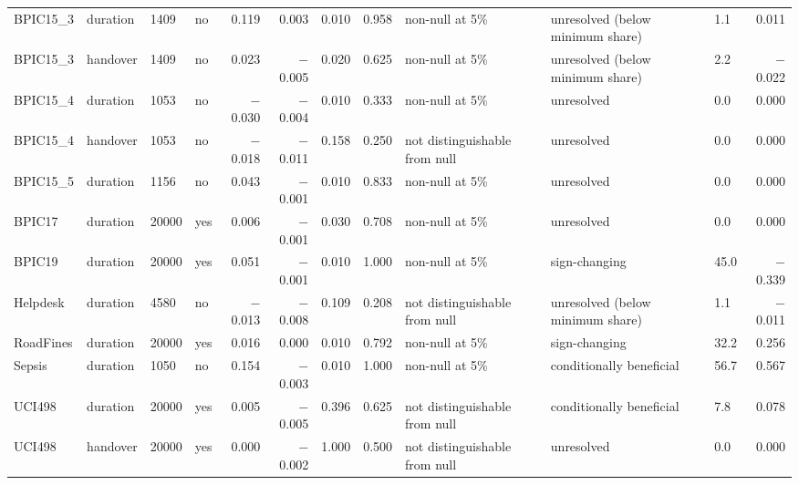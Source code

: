 \begin{landscape}
\begin{table}[t]
{\begin{tabular}{llllrrrrlllr}
BPIC15\_3 & duration & 1409 & no & 0.119 & 0.003 & 0.010 & 0.958 & non-null at 5\% & unresolved (below minimum share) & 1.1 & 0.011 \\
BPIC15\_3 & handover & 1409 & no & 0.023 & $-$0.005 & 0.020 & 0.625 & non-null at 5\% & unresolved (below minimum share) & 2.2 & $-$0.022 \\
BPIC15\_4 & duration & 1053 & no & $-$0.030 & $-$0.004 & 0.010 & 0.333 & non-null at 5\% & unresolved & 0.0 & 0.000 \\
BPIC15\_4 & handover & 1053 & no & $-$0.018 & $-$0.011 & 0.158 & 0.250 & not distinguishable from null & unresolved & 0.0 & 0.000 \\
BPIC15\_5 & duration & 1156 & no & 0.043 & $-$0.001 & 0.010 & 0.833 & non-null at 5\% & unresolved & 0.0 & 0.000 \\
BPIC17 & duration & 20000 & yes & 0.006 & $-$0.001 & 0.030 & 0.708 & non-null at 5\% & unresolved & 0.0 & 0.000 \\
BPIC19 & duration & 20000 & yes & 0.051 & $-$0.001 & 0.010 & 1.000 & non-null at 5\% & sign-changing & 45.0 & $-$0.339 \\
Helpdesk & duration & 4580 & no & $-$0.013 & $-$0.008 & 0.109 & 0.208 & not distinguishable from null & unresolved (below minimum share) & 1.1 & $-$0.011 \\
RoadFines & duration & 20000 & yes & 0.016 & 0.000 & 0.010 & 0.792 & non-null at 5\% & sign-changing & 32.2 & 0.256 \\
Sepsis & duration & 1050 & no & 0.154 & $-$0.003 & 0.010 & 1.000 & non-null at 5\% & conditionally beneficial & 56.7 & 0.567 \\
UCI498 & duration & 20000 & yes & 0.005 & $-$0.005 & 0.396 & 0.625 & not distinguishable from null & conditionally beneficial & 7.8 & 0.078 \\
UCI498 & handover & 20000 & yes & 0.000 & $-$0.002 & 1.000 & 0.500 & not distinguishable from null & unresolved & 0.0 & 0.000 \\
\bottomrule
\end{tabular}%
}

\end{table}
\end{landscape}
